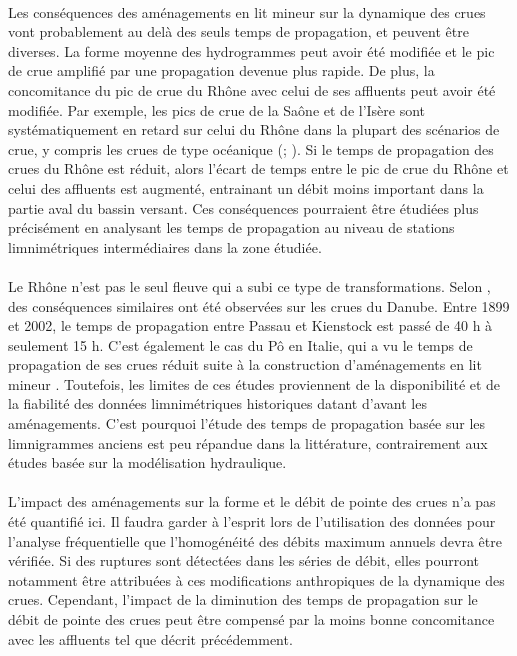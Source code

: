 \documentclass[11pt]{article}
\begin{document}
	\paragraph{} Les conséquences des aménagements en lit mineur sur la dynamique des crues vont probablement au delà des seuls temps de propagation, et peuvent être diverses. La forme moyenne des hydrogrammes peut avoir été modifiée et le pic de crue amplifié par une propagation devenue plus rapide. De plus, la concomitance du pic de crue du Rhône avec celui de ses affluents peut avoir été modifiée. Par exemple, les pics de crue de la Saône et de l'Isère sont systématiquement en retard sur celui du Rhône dans la plupart des scénarios de crue, y compris les crues de type océanique (\cite{parde_regime_1925}; \cite{rigaudiere_etude_2000}). Si le temps de propagation des crues du Rhône est réduit, alors l'écart de temps entre le pic de crue du Rhône et celui des affluents est augmenté, entrainant un débit moins important dans la partie aval du bassin versant. Ces conséquences pourraient être étudiées plus précisément en analysant les temps de propagation au niveau de stations limnimétriques intermédiaires dans la zone étudiée.

	\paragraph{} Le Rhône n'est pas le seul fleuve qui a subi ce type de transformations. Selon \citet{mitkova_analysis_2005}, des conséquences similaires ont été observées sur les crues du Danube. Entre 1899 et 2002, le temps de propagation entre Passau et Kienstock est passé de 40 h à seulement 15 h. C'est également le cas du Pô en Italie, qui a vu le temps de propagation de ses crues réduit suite à la construction d'aménagements en lit mineur \citep{di_baldassare_analysis_2009}. Toutefois, les limites de ces études proviennent de la disponibilité et de la fiabilité des données limnimétriques historiques datant d'avant les aménagements. C'est pourquoi l'étude des temps de propagation basée sur les limnigrammes anciens est peu répandue dans la littérature, contrairement aux études basée sur la modélisation hydraulique.
	
	\paragraph{} L'impact des aménagements sur la forme et le débit de pointe des crues n'a pas été quantifié ici. Il faudra garder à l'esprit lors de l'utilisation des données pour l'analyse fréquentielle que l'homogénéité des débits maximum annuels devra être vérifiée. Si des ruptures sont détectées dans les séries de débit, elles pourront notamment être attribuées à ces modifications anthropiques de la dynamique des crues. Cependant, l'impact de la diminution des temps de propagation sur le débit de pointe des crues peut être compensé par la moins bonne concomitance avec les affluents tel que décrit précédemment.
\end{document}
